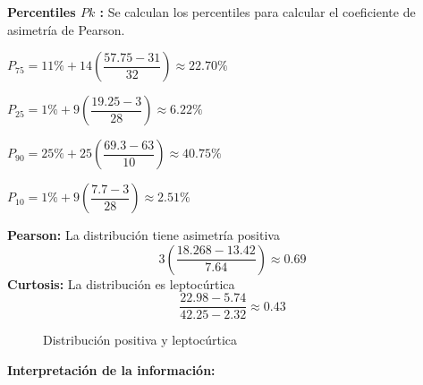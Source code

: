 \vspace{-0.5cm}
\textbf{Percentiles $Pk$ :} Se calculan los percentiles para calcular el coeficiente de asimetría de Pearson.
\begin{multicols}{2}

	$P_{75} = 11\% + 14\left(\dfrac{57.75 - 31}{32}\right) \approx 22.70\%$

	$P_{25} = 1\% + 9\left(\dfrac{19.25 - 3}{28}\right) \approx 6.22\%$

	$P_{90} = 25\% + 25\left(\dfrac{69.3 - 63}{10}\right) \approx 40.75\%$

	$P_{10} = 1\% + 9\left(\dfrac{7.7 - 3}{28}\right) \approx 2.51\%$
\end{multicols}
\begin{multicols}{2}
	\textbf{Pearson:} La distribución tiene asimetría positiva
	\begin{equation*}
		3\left(\dfrac{18.268-13.42}{7.64}\right) \approx 0.69
	\end{equation*}
	\textbf{Curtosis:} La distribución es leptocúrtica
	\begin{equation*}
		\dfrac{22.98-5.74}{42.25-2.32} \approx 0.43
	\end{equation*}
\end{multicols}
\vspace{-0.5cm}
\begin{figure}[H]
	\centering
	\hspace*{-1.2cm}
	\vspace{-0.4cm}
	\caption{Distribución positiva y leptocúrtica}
\end{figure}
\vspace{-0.8cm}
\textbf{Interpretación de la información:}

